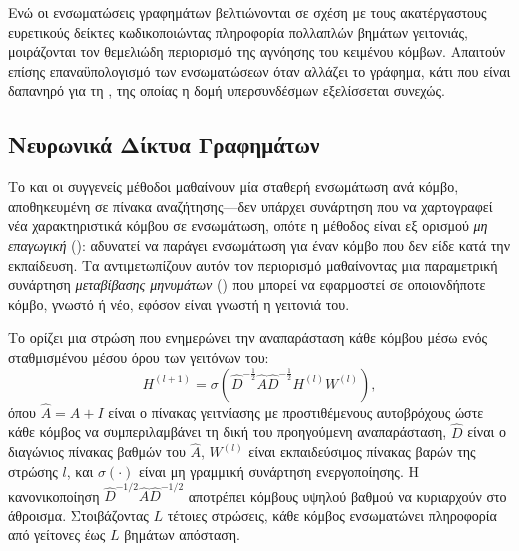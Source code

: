 Ενώ οι ενσωματώσεις γραφημάτων βελτιώνονται σε σχέση με τους ακατέργαστους ευρετικούς δείκτες
κωδικοποιώντας πληροφορία πολλαπλών βημάτων γειτονιάς, μοιράζονται τον θεμελιώδη
περιορισμό της αγνόησης του κειμένου κόμβων.
Απαιτούν επίσης επαναϋπολογισμό των
ενσωματώσεων όταν αλλάζει το γράφημα, κάτι που είναι δαπανηρό για τη ,
της οποίας η δομή υπερσυνδέσμων εξελίσσεται συνεχώς.

\subsection{Νευρωνικά Δίκτυα Γραφημάτων}
\label{subsec:gnns}

Το  και οι συγγενείς μέθοδοι μαθαίνουν μία σταθερή ενσωμάτωση ανά κόμβο,
αποθηκευμένη σε πίνακα αναζήτησης---δεν υπάρχει συνάρτηση που να χαρτογραφεί νέα
χαρακτηριστικά κόμβου σε ενσωμάτωση, οπότε η μέθοδος είναι εξ ορισμού \textit{μη
επαγωγική} (): αδυνατεί να παράγει ενσωμάτωση για έναν κόμβο που δεν
είδε κατά την εκπαίδευση.
Τα \textbf{} αντιμετωπίζουν
αυτόν τον περιορισμό μαθαίνοντας μια παραμετρική συνάρτηση \textit{μεταβίβασης
μηνυμάτων} () που μπορεί να εφαρμοστεί σε οποιονδήποτε κόμβο,
γνωστό ή νέο, εφόσον είναι γνωστή η γειτονιά του.

Το \textbf{} \cite{kipfwelling2017gcn} ορίζει
μια στρώση που ενημερώνει την αναπαράσταση κάθε κόμβου μέσω ενός σταθμισμένου μέσου
όρου των γειτόνων του:
\begin{equation}
    H^{(l+1)} = \sigma\!\left(\hat{D}^{-\frac{1}{2}} \hat{A} \hat{D}^{-\frac{1}{2}} H^{(l)} W^{(l)}\right),
    \label{eq:gcn}
\end{equation}
όπου $\hat{A} = A + I$ είναι ο πίνακας γειτνίασης με προστιθέμενους αυτοβρόχους ώστε
κάθε κόμβος να συμπεριλαμβάνει τη δική του προηγούμενη αναπαράσταση, $\hat{D}$ είναι ο
διαγώνιος πίνακας βαθμών του $\hat{A}$, $W^{(l)}$ είναι εκπαιδεύσιμος πίνακας βαρών
της στρώσης $l$, και $\sigma(\cdot)$ είναι μη γραμμική συνάρτηση ενεργοποίησης.
Η κανονικοποίηση $\hat{D}^{-1/2} \hat{A} \hat{D}^{-1/2}$ αποτρέπει κόμβους υψηλού
βαθμού να κυριαρχούν στο άθροισμα.
Στοιβάζοντας $L$ τέτοιες στρώσεις, κάθε κόμβος
ενσωματώνει πληροφορία από γείτονες έως $L$ βημάτων απόσταση.

